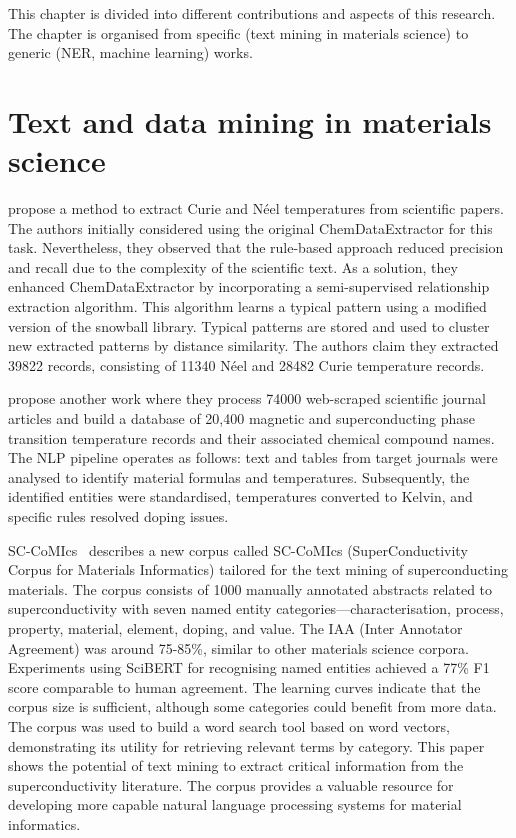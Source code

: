 
This chapter is divided into different contributions and aspects of this research.
The chapter is organised from specific (text mining in materials science) to generic (NER, machine learning) works.

\section{Text and data mining in materials science}

\cite{court2018auto} propose a method to extract Curie and Néel temperatures from scientific papers. 
The authors initially considered using the original ChemDataExtractor for this task. 
Nevertheless, they observed that the rule-based approach reduced precision and recall due to the complexity of the scientific text. As a solution, they enhanced ChemDataExtractor by incorporating a semi-supervised relationship extraction algorithm.
This algorithm learns a typical pattern using a modified version of the snowball library. Typical patterns are stored and used to cluster new extracted patterns by distance similarity. 
The authors claim they extracted 39822 records, consisting of 11340 Néel and 28482 Curie temperature records. 

\cite{court2020magnetic} propose another work where they process 74000 web-scraped scientific journal articles and build a database of 20,400 magnetic and superconducting phase transition temperature records and their associated chemical compound names.
The NLP pipeline operates as follows: text and tables from target journals were analysed to identify material formulas and temperatures. Subsequently, the identified entities were standardised, temperatures converted to Kelvin, and specific rules resolved doping issues.



SC-CoMIcs~\cite{yamaguchi-etal-2020-sc} describes a new corpus called SC-CoMIcs (SuperConductivity Corpus for Materials Informatics) tailored for the text mining of superconducting materials.
The corpus consists of 1000 manually annotated abstracts related to superconductivity with seven named entity categories—characterisation, process, property, material, element, doping, and value. The IAA (Inter Annotator Agreement) was around 75-85\%, similar to other materials science corpora.
Experiments using SciBERT for recognising named entities achieved a 77\% F1 score comparable to human agreement.
The learning curves indicate that the corpus size is sufficient, although some categories could benefit from more data. The corpus was used to build a word search tool based on word vectors, demonstrating its utility for retrieving relevant terms by category. This paper shows the potential of text mining to extract critical information from the superconductivity literature. The corpus provides a valuable resource for developing more capable natural language processing systems for material informatics.  

